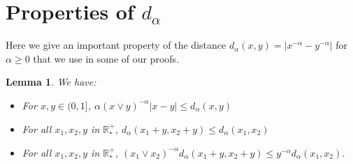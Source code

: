 \documentclass[11pt,a4paper]{article}
\newcommand{\RRP}{\mathbb{R}^+_*}
\newtheorem{lemma}[theorem]{Lemma}
\begin{document}
\section{Properties of $d_\alpha$}
Here we give an important property of the distance $d_\alpha(x,y) = |x^{-\alpha} - y^{-\alpha}|$ for $\alpha \geq 0$ that we use in some of our proofs.
\begin{lemma}\label{lem:properties-of-d-alpha}
    We have:
    \begin{itemize}
        \item For $x,y \in (0,1]$, $\alpha(x \vee y)^{-\alpha}|x - y| \leq d_\alpha(x,y)$
        \item For all $x_1,x_2, y$ in $\RRP$, $d_\alpha(x_1 + y,x_2 + y) \leq d_\alpha(x_1,x_2)$
        \item For all $x_1,x_2, y$ in $\RRP$, $(x_1 \vee x_2)^{-\alpha} d_\alpha(x_1 + y,x_2 + y) \leq y^{-\alpha} d_\alpha(x_1,x_2)$.
    \end{itemize}
\end{lemma}
\end{document}
